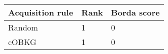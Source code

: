 \begin{tabular}{lll}
Acquisition rule & Rank & Borda score \\ 
\hline 
Random & 1 & 0 \\ 
cOBKG  & 1 & 0 \\ 
\hline 
\end{tabular}